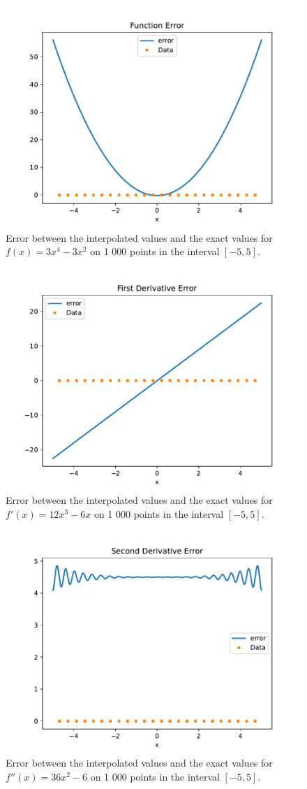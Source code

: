 \documentclass[11pt]{article}
\begin{document}
\begin{enumerate}
    \begin{figure}[H]
        \begin{center}
            \includegraphics[width=.6\textwidth]{Plots/q2a1.pdf}
            \caption{Error between the interpolated values and the exact values for $f(x)=3x^4-3x^2$ on 1 000 points in the interval $[-5,5]$.}
            \label{fig:q2a1}
        \end{center}
    \end{figure}

    \begin{figure}[H]
        \begin{center}
            \includegraphics[width=.6\textwidth]{Plots/q2a2.pdf}
            \caption{Error between the interpolated values and the exact values for $f'(x)=12x^3-6x$ on 1 000 points in the interval $[-5,5]$.}
            \label{fig:q2a2}
        \end{center}
    \end{figure}

    \begin{figure}[H]
        \begin{center}
            \includegraphics[width=.6\textwidth]{Plots/q2a3.pdf}
            \caption{Error between the interpolated values and the exact values for $f''(x)=36x^2-6$ on 1 000 points in the interval $[-5,5]$.}
            \label{fig:q2a3}
        \end{center}
    \end{figure}


\end{enumerate}
\end{document}
